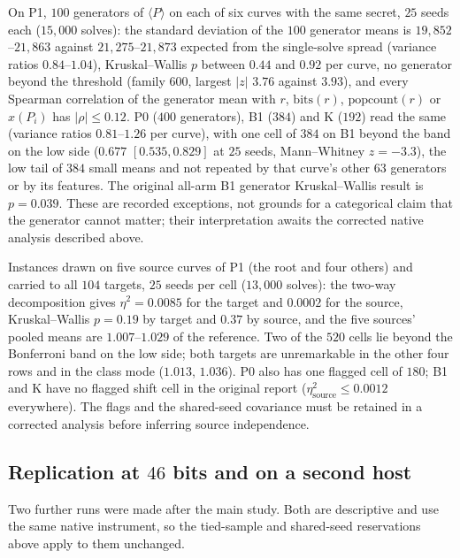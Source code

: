 \documentclass[10pt,a4paper]{article}
\theoremstyle{remark}
\begin{document}
On P1, $100$ generators of $\langle P\rangle$ on each of six curves with the
same secret, $25$ seeds each ($15{,}000$ solves): the standard deviation of
the $100$ generator means is $19{,}852$--$21{,}863$ against $21{,}275$--$21{,}873$
expected from the single-solve spread (variance ratios $0.84$--$1.04$),
Kruskal--Wallis $p$ between $0.44$ and $0.92$ per curve, no generator beyond
the threshold (family $600$, largest $|z|$ $3.76$ against $3.93$), and every
Spearman correlation of the generator mean with $r$, $\mathrm{bits}(r)$,
$\mathrm{popcount}(r)$ or $x(P_i)$ has $|\rho| \le 0.12$. P0 ($400$
generators), B1 ($384$) and K ($192$) read the same (variance ratios
$0.81$--$1.26$ per curve), with one cell of $384$ on B1 beyond the band on the
low side ($0.677$ $[0.535, 0.829]$ at $25$ seeds, Mann--Whitney $z = -3.3$),
the low tail of $384$ small means and not repeated by that curve's other $63$
generators or by its features. The original all-arm B1 generator
Kruskal--Wallis result is $p=0.039$. These are recorded exceptions, not
grounds for a categorical claim that the generator cannot matter; their
interpretation awaits the corrected native analysis described above.

Instances drawn on five source curves of P1 (the root and four others) and
carried to all $104$ targets, $25$ seeds per cell ($13{,}000$ solves): the
two-way decomposition gives $\eta^2 = 0.0085$ for the target and $0.0002$ for
the source, Kruskal--Wallis $p = 0.19$ by target and $0.37$ by source, and
the five sources' pooled means are $1.007$--$1.029$ of the reference. Two of
the $520$ cells lie beyond the Bonferroni band on the low side; both targets
are unremarkable in the other four rows and in the class mode ($1.013$,
$1.036$). P0 also has one flagged cell of $180$; B1 and K have no flagged
shift cell in the original report
($\eta^2_{\mathrm{source}} \le 0.0012$ everywhere). The flags and the
shared-seed covariance must be retained in a corrected analysis before
inferring source independence.

\subsection{Replication at $46$ bits and on a second host}
\label{sec:replica}

Two further runs were made after the main study. Both are descriptive and
use the same native instrument, so the tied-sample and shared-seed reservations
above apply to them unchanged.
\end{document}
